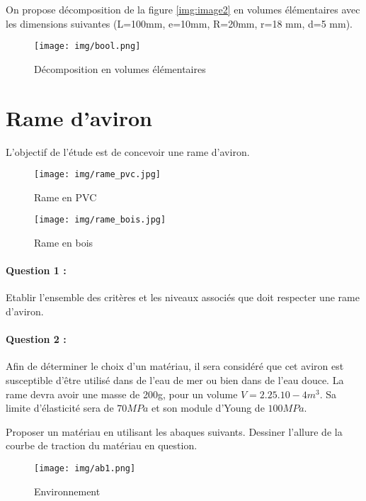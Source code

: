 On propose décomposition de la figure \ref{img:image2} en volumes élémentaires avec les dimensions suivantes (L=100mm, e=10mm, R=20mm, r=18 mm, d=5 mm).

\begin{figure}[!h] 
  \centering\texttt{[image: img/bool.png]}
  \caption{Décomposition en volumes élémentaires}
  \label{img:image3}
\end{figure}

\newpage

\section{Rame d'aviron}
 
L'objectif de l'étude est de concevoir une rame d'aviron. 
 
\begin{figure}[!h]
 \begin{minipage}{0.49\linewidth}
  \centering\texttt{[image: img/rame\_pvc.jpg]}
  \caption{Rame en PVC}
  \label{img:image4}
 \end{minipage}
\hfill
 \begin{minipage}{0.49\linewidth}
   \centering\texttt{[image: img/rame\_bois.jpg]}
  \caption{Rame en bois}
  \label{img:image5}
 \end{minipage}
\end{figure}
 
\paragraph{Question 1 :} Etablir l'ensemble des critères et les niveaux associés que doit respecter une rame d'aviron. 

\paragraph{Question 2 :} Afin de déterminer le choix d'un matériau, il sera considéré que cet aviron est susceptible d'être utilisé dans de l'eau de mer ou bien dans de l'eau douce. La rame devra avoir une  masse de 200g, pour un volume $V=2.25.10-4 m^3$. Sa limite d'élasticité sera de $70 MPa$ et son module d'Young de $100 MPa$. 
 
Proposer un matériau en utilisant les abaques suivants. Dessiner l'allure de la courbe de traction du matériau en question. 

\begin{figure}[!h] 
  \centering\texttt{[image: img/ab1.png]}
  \caption{Environnement}
  \label{img:image6}
\end{figure}

